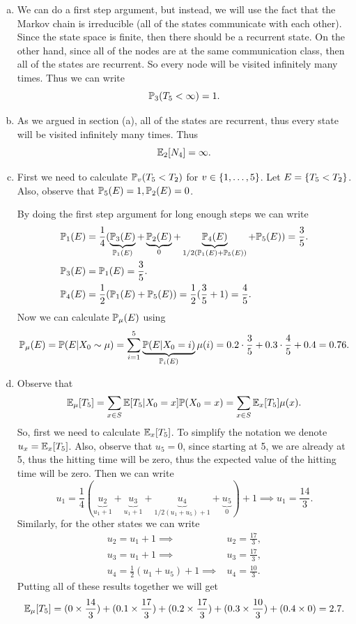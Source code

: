 \begin{solution}
	\begin{enumerate}[(a)]
		\item We can do a first step argument, but instead, we will use the fact that the Markov chain is irreducible (all of the states communicate with each other). Since the state space is finite, then there should be a recurrent state. On the other hand, since all of the nodes are at the same communication class, then all of the states are recurrent. So every node will be visited infinitely many times. Thus we can write
		\[ \mathbb{P}_3(T_5 < \infty) = 1. \]
		
		\item As we argued in section (a), all of the states are recurrent, thus every state will be visited infinitely many times. Thus
		\[ \mathbb{E}_2[N_4] = \infty. \]
		
		\item First we need to calculate $\mathbb{P}_v(T_5<T_2)$ for $v \in \{1,\hdots,5\}$. Let $E=\{T_5<T_2\}$. Also, observe that $\mathbb{P}_5(E) = 1, \mathbb{P}_2(E) = 0$.
		
		By doing the first step argument for long enough steps we can write
		\begin{align*}
			\mathbb{P}_1(E) &= \frac{1}{4}(\underbrace{\mathbb{P}_3(E)}_{\mathbb{P}_1(E)} + \underbrace{\mathbb{P}_2(E)}_{0} + \underbrace{\mathbb{P}_4(E)}_{1/2(\mathbb{P}_1(E)+\mathbb{P}_5(E))} + \mathbb{P}_5(E)) = \frac{3}{5}.\\
			\mathbb{P}_3(E) &= \mathbb{P}_1(E) = \frac{3}{5}.\\
			\mathbb{P}_4(E) &= \frac{1}{2} (\mathbb{P}_1(E) + \mathbb{P}_5(E)) = \frac{1}{2}(\frac{3}{5} + 1) = \frac{4}{5}.
		\end{align*}
		Now we can calculate $\mathbb{P}_\mu(E)$ using
		\[ \mathbb{P}_\mu(E) = \mathbb{P}(E|X_0\sim \mu) = \sum_{i=1}^{5}\underbrace{\mathbb{P}(E|X_0=i)}_{\mathbb{P}_i(E)}\mu(i) = 0.2\cdot \frac{3}{5} + 0.3\cdot \frac{4}{5} + 0.4 = 0.76. \]
		
		\item Observe that 
		\[ \mathbb{E}_\mu[T_5] = \sum_{x\in S} \mathbb{E}[T_5|X_0=x]\mathbb{P}(X_0=x) = \sum_{x\in S} \mathbb{E}_x[T_5]\mu(x). \]
		So, first we need to calculate $\mathbb{E}_x[T_5]$. To simplify the notation we denote $u_x = \mathbb{E}_x[T_5]$. Also, observe that $u_5 = 0$, since starting at 5, we are already at 5, thus the hitting time will be zero, thus the expected value of the hitting time will be zero.
		Then we can write
		\[ u_1 = \frac{1}{4}(\underbrace{u_2}_{u_1 + 1}+ \underbrace{u_3}_{u_1+1} + \underbrace{u_4}_{1/2(u_1 + u_5)+1} + \underbrace{u_5}_{0})+1 \implies \boxed{u_1 = \frac{14}{3}}. \]
		Similarly, for the other states we can write
		\begin{align*}
			u_2 = u_1 + 1 \implies &\boxed{u_2 = \frac{17}{3}},\\
			u_3 = u_1 + 1 \implies &\boxed{u_3 = \frac{17}{3}}, \\
			u_4 = \frac{1}{2}(u_1 + u_5) + 1 \implies &\boxed{u_4 = \frac{10}{3}}.
		\end{align*}
		Putting all of these results together we will get
		\[ \mathbb{E}_\mu[T_5] = (0\times \frac{14}{3}) + (0.1\times \frac{17}{3}) + (0.2\times\frac{17}{3}) + (0.3\times\frac{10}{3}) + (0.4\times0) = 2.7.  \]
		

\end{enumerate}
\end{solution}

